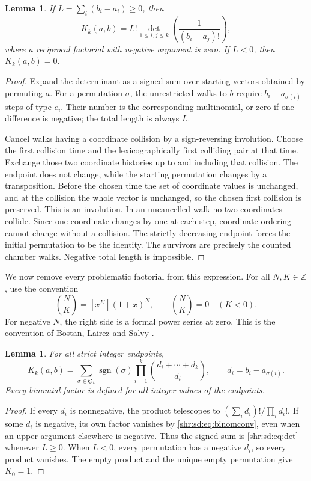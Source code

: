 \documentclass[11pt,letterpaper]{article}
\numberwithin{equation}{section}
\newtheorem{lemma}[theorem]{Lemma}
\theoremstyle{definition}
\newcommand{\1}{\mathbf 1}
\DeclareMathOperator{\sgn}{sgn}
\newcommand{\Z}{\mathbb Z}
\begin{document}
\begin{lemma}\label{shr:sd:lem:reflection}
If $L=\sum_i(b_i-a_i)\ge0$, then
\begin{equation}\label{shr:sd:eq:det}
 K_k(a,b)=L!\det_{1\le i,j\le k}\left(\frac1{(b_i-a_j)!}\right),
\end{equation}
where a reciprocal factorial with negative argument is zero. If $L<0$, then $K_k(a,b)=0$.
\end{lemma}
\begin{proof}
Expand the determinant as a signed sum over starting vectors obtained by permuting $a$. For a permutation $\sigma$, the unrestricted walks to $b$ require $b_i-a_{\sigma(i)}$ steps of type $e_i$. Their number is the corresponding multinomial, or zero if one difference is negative; the total length is always $L$.

Cancel walks having a coordinate collision by a sign-reversing involution. Choose the first collision time and the lexicographically first colliding pair at that time. Exchange those two coordinate histories up to and including that collision. The endpoint does not change, while the starting permutation changes by a transposition. Before the chosen time the set of coordinate values is unchanged, and at the collision the whole vector is unchanged, so the chosen first collision is preserved. This is an involution. In an uncancelled walk no two coordinates collide. Since one coordinate changes by one at each step, coordinate ordering cannot change without a collision. The strictly decreasing endpoint forces the initial permutation to be the identity. The survivors are precisely the counted chamber walks. Negative total length is impossible.
\end{proof}

We now remove every problematic factorial from this expression. For all $N,K\in\Z$, use the convention
\begin{equation}\label{shr:sd:eq:binomconv}
 \binom NK=[x^K](1+x)^N,
 \qquad \binom NK=0\quad(K<0).
\end{equation}
For negative $N$, the right side is a formal power series at zero. This is the convention of Bostan, Lairez and Salvy \cite[Section 1.1]{BLS}.

\begin{lemma}\label{shr:sd:lem:binom}
For all strict integer endpoints,
\begin{equation}\label{shr:sd:eq:kernel}
 K_k(a,b)=\sum_{\sigma\in\mathfrak S_k}\sgn(\sigma)
       \prod_{i=1}^k\binom{d_i+\cdots+d_k}{d_i},
 \qquad d_i=b_i-a_{\sigma(i)}.
\end{equation}
Every binomial factor is defined for all integer values of the endpoints.
\end{lemma}
\begin{proof}
If every $d_i$ is nonnegative, the product telescopes to
$(\sum_i d_i)!/\prod_i d_i!$. If some $d_i$ is negative, its own factor vanishes by \eqref{shr:sd:eq:binomconv}, even when an upper argument elsewhere is negative. Thus the signed sum is \eqref{shr:sd:eq:det} whenever $L\ge0$. When $L<0$, every permutation has a negative $d_i$, so every product vanishes. The empty product and the unique empty permutation give $K_0=1$.
\end{proof}
\end{document}
